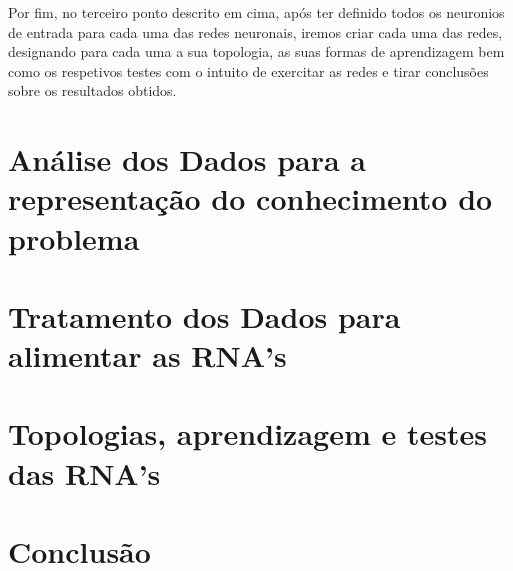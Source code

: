 \documentclass{report}
\begin{document}
Por fim, no terceiro ponto descrito em cima, após ter definido todos os neuronios de entrada para cada uma das redes neuronais, iremos criar cada uma das redes, designando para cada uma a sua topologia, as suas formas de aprendizagem bem como os respetivos testes com o intuito de exercitar as redes e tirar conclusões sobre os resultados obtidos.


\chapter{Análise dos Dados para a representação do conhecimento do problema}

\chapter{Tratamento dos Dados para alimentar as RNA's}

\chapter{Topologias, aprendizagem e testes das RNA's}






\chapter{Conclusão} \label{concl}

 


 
 
 
\end{document}
